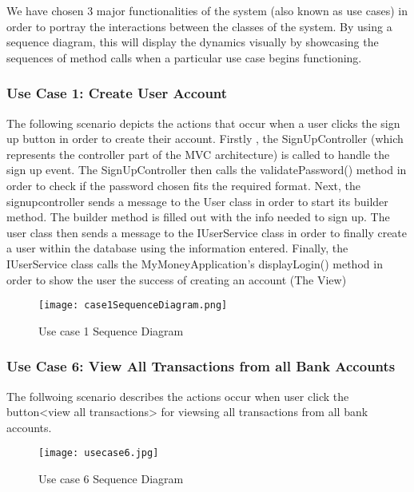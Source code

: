 \documentclass[12pt]{article}
\begin{document}
We have chosen 3 major functionalities of the system (also known as use cases) in order to portray the interactions between the classes of the system. By using a sequence diagram, this will display the dynamics visually by showcasing the sequences of method calls when a particular use case begins functioning. 

\clearpage

\subsubsection{Use Case 1: Create User Account}

The following scenario depicts the actions that occur when a user clicks the sign up button in order to create their account. Firstly , the SignUpController (which represents the controller part of the MVC architecture) is called to handle the sign up event. The SignUpController then calls the validatePassword() method in order to check if the password chosen fits the required format. Next, the signupcontroller sends a message to the User class in order to start its builder method. The builder method is filled out with the info needed to sign up. The user class then sends a message to the IUserService class in order to finally create a user within the database using the information entered. Finally, the IUserService class calls the MyMoneyApplication's displayLogin() method in order to show the user the success of creating an account (The View)

\begin{figure}[H]
\texttt{[image: case1SequenceDiagram.png]}
\caption{Use case 1 Sequence Diagram}
\label{fig:use-case-1-sequence-diagram}
\end{figure}

\clearpage

\clearpage

\subsubsection{Use Case 6: View All Transactions from all Bank Accounts}

The follwoing scenario describes the actions occur when user click the button<view all transactions> for viewsing all transactions from all bank accounts.

\begin{figure}[H]
\texttt{[image: usecase6.jpg]}
\caption{Use case 6 Sequence Diagram}
\label{fig:use-case-6-sequence-diagram}
\end{figure}
\end{document}
